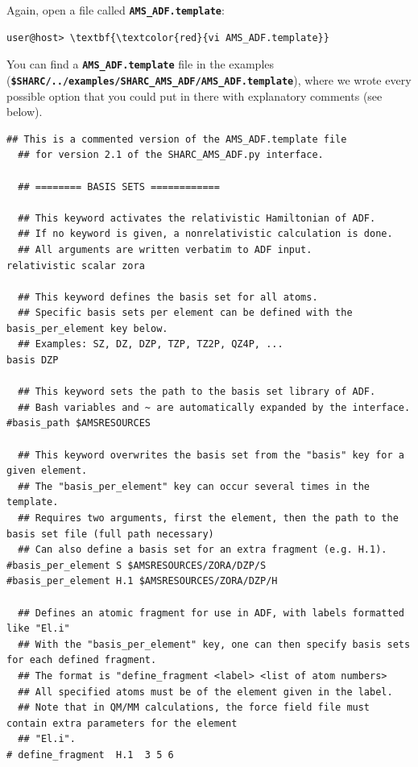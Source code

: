 \documentclass[a4paper,11pt,DIV=15,openany]{scrbook}
\newcommand{\ttt}[1]{\textbf{\texttt{#1}}}
\begin{document}
Again, open a file called \ttt{AMS_ADF.template}:
\begin{Verbatim}[commandchars=\\\{\}]
user@host> \textbf{\textcolor{red}{vi AMS_ADF.template}}
\end{Verbatim}
You can find a \ttt{AMS_ADF.template} file in the examples (\ttt{\$SHARC/../examples/SHARC\_AMS_ADF/AMS_ADF.template}), where we wrote every possible option that you could put in there with explanatory comments (see below).
\begin{oframed}
\footnotesize\begin{Verbatim}[commandchars=\\\{\}]
  ## This is a commented version of the AMS_ADF.template file 
  ## for version 2.1 of the SHARC_AMS_ADF.py interface.

  ## ======== BASIS SETS ============

  ## This keyword activates the relativistic Hamiltonian of ADF.
  ## If no keyword is given, a nonrelativistic calculation is done.
  ## All arguments are written verbatim to ADF input.
relativistic scalar zora

  ## This keyword defines the basis set for all atoms.
  ## Specific basis sets per element can be defined with the basis_per_element key below.
  ## Examples: SZ, DZ, DZP, TZP, TZ2P, QZ4P, ...
basis DZP

  ## This keyword sets the path to the basis set library of ADF.
  ## Bash variables and ~ are automatically expanded by the interface.
#basis_path $AMSRESOURCES

  ## This keyword overwrites the basis set from the "basis" key for a given element.
  ## The "basis_per_element" key can occur several times in the template.
  ## Requires two arguments, first the element, then the path to the basis set file (full path necessary)
  ## Can also define a basis set for an extra fragment (e.g. H.1).
#basis_per_element S $AMSRESOURCES/ZORA/DZP/S
#basis_per_element H.1 $AMSRESOURCES/ZORA/DZP/H

  ## Defines an atomic fragment for use in ADF, with labels formatted like "El.i"
  ## With the "basis_per_element" key, one can then specify basis sets for each defined fragment.
  ## The format is "define_fragment <label> <list of atom numbers>
  ## All specified atoms must be of the element given in the label.
  ## Note that in QM/MM calculations, the force field file must contain extra parameters for the element 
  ## "El.i".
# define_fragment  H.1  3 5 6




\end{Verbatim}
\end{oframed}
\end{document}
